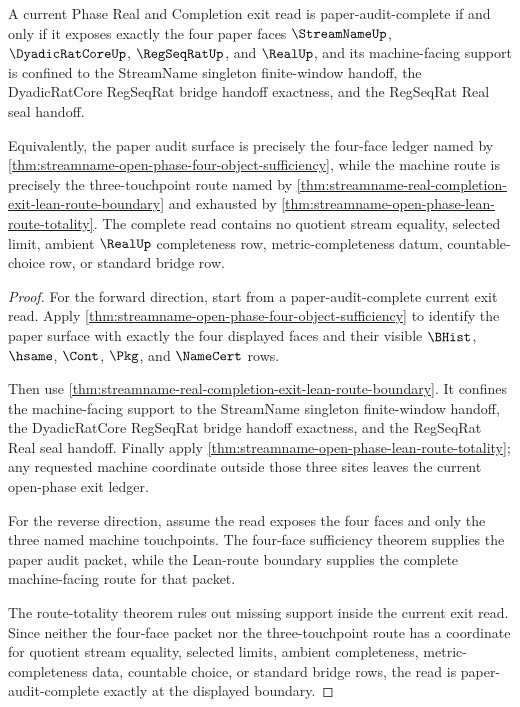 \begin{theorem}
\label{thm:streamname-real-completion-touchpoint-minimality}
A current Phase Real and Completion exit read is paper-audit-complete if and only if it exposes exactly the four paper faces $\StreamNameUp$, $\DyadicRatCoreUp$, $\RegSeqRatUp$, and $\RealUp$, and its machine-facing support is confined to the StreamName singleton finite-window handoff, the DyadicRatCore RegSeqRat bridge handoff exactness, and the RegSeqRat Real seal handoff.

Equivalently, the paper audit surface is precisely the four-face ledger named by \autoref{thm:streamname-open-phase-four-object-sufficiency}, while the machine route is precisely the three-touchpoint route named by \autoref{thm:streamname-real-completion-exit-lean-route-boundary} and exhausted by \autoref{thm:streamname-open-phase-lean-route-totality}. The complete read contains no quotient stream equality, selected limit, ambient $\RealUp$ completeness row, metric-completeness datum, countable-choice row, or standard bridge row.
\end{theorem}
\begin{proof}
For the forward direction, start from a paper-audit-complete current exit read. Apply \autoref{thm:streamname-open-phase-four-object-sufficiency} to identify the paper surface with exactly the four displayed faces and their visible $\BHist$, $\hsame$, $\Cont$, $\Pkg$, and $\NameCert$ rows.

Then use \autoref{thm:streamname-real-completion-exit-lean-route-boundary}. It confines the machine-facing support to the StreamName singleton finite-window handoff, the DyadicRatCore RegSeqRat bridge handoff exactness, and the RegSeqRat Real seal handoff. Finally apply \autoref{thm:streamname-open-phase-lean-route-totality}; any requested machine coordinate outside those three sites leaves the current open-phase exit ledger.

For the reverse direction, assume the read exposes the four faces and only the three named machine touchpoints. The four-face sufficiency theorem supplies the paper audit packet, while the Lean-route boundary supplies the complete machine-facing route for that packet.

The route-totality theorem rules out missing support inside the current exit read. Since neither the four-face packet nor the three-touchpoint route has a coordinate for quotient stream equality, selected limits, ambient completeness, metric-completeness data, countable choice, or standard bridge rows, the read is paper-audit-complete exactly at the displayed boundary.
\end{proof}

